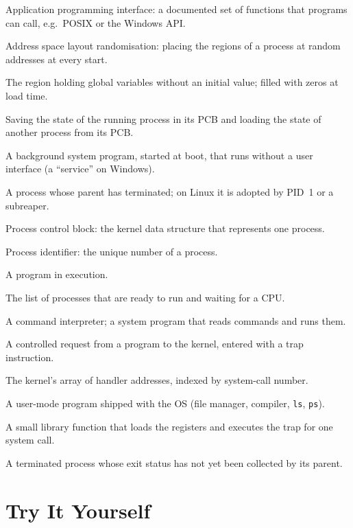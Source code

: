\documentclass[11pt,a4paper]{article}
\newcommand{\cmd}[1]{\texttt{#1}}
\begin{document}
\begin{description}[leftmargin=1em,itemsep=0.1em]
  \item[API] Application programming interface: a documented set of functions that programs can call, e.g.\ POSIX or the Windows API.
  \item[ASLR] Address space layout randomisation: placing the regions of a process at random addresses at every start.
  \item[BSS] The region holding global variables without an initial value; filled with zeros at load time.
  \item[Context switch] Saving the state of the running process in its PCB and loading the state of another process from its PCB.
  \item[Daemon] A background system program, started at boot, that runs without a user interface (a ``service'' on Windows).
  \item[Orphan] A process whose parent has terminated; on Linux it is adopted by PID~1 or a subreaper.
  \item[PCB] Process control block: the kernel data structure that represents one process.
  \item[PID] Process identifier: the unique number of a process.
  \item[Process] A program in execution.
  \item[Ready queue] The list of processes that are ready to run and waiting for a CPU.
  \item[Shell] A command interpreter; a system program that reads commands and runs them.
  \item[System call] A controlled request from a program to the kernel, entered with a trap instruction.
  \item[System-call table] The kernel's array of handler addresses, indexed by system-call number.
  \item[System program] A user-mode program shipped with the OS (file manager, compiler, \cmd{ls}, \cmd{ps}).
  \item[Wrapper] A small library function that loads the registers and executes the trap for one system call.
  \item[Zombie] A terminated process whose exit status has not yet been collected by its parent.
\end{description}

\section{Try It Yourself}
\end{document}
